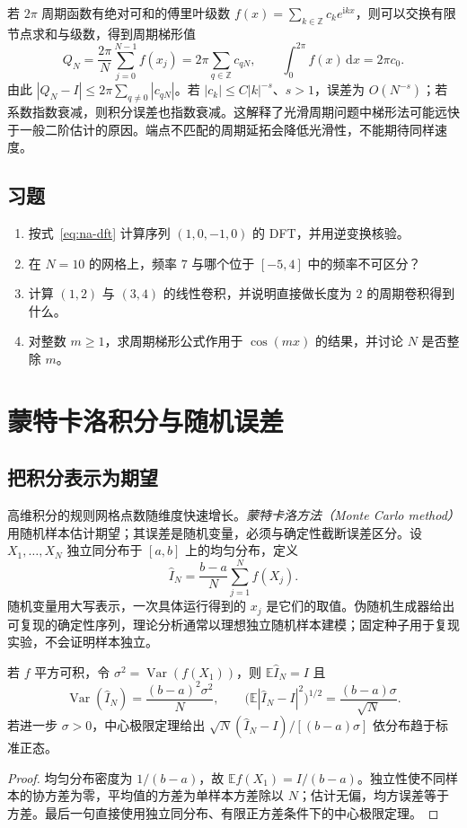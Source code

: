 \documentclass[UTF8,12pt,a4paper,fontset=fandol]{ctexbook}
\begin{document}
若 $2\pi$ 周期函数有绝对可和的傅里叶级数 $f(x)=\sum_{k\in\mathbb Z}c_ke^{\mathrm i kx}$，则可以交换有限节点求和与级数，得到周期梯形值
\[
 Q_N=\frac{2\pi}{N}\sum_{j=0}^{N-1}f(x_j)=2\pi\sum_{q\in\mathbb Z}c_{qN},\qquad
 \int_0^{2\pi}f(x)\,\mathrm dx=2\pi c_0.
\]
由此 $|Q_N-I|\le2\pi\sum_{q\ne0}|c_{qN}|$。若 $|c_k|\le C|k|^{-s}$、$s>1$，误差为 $O(N^{-s})$；若系数指数衰减，则积分误差也指数衰减。这解释了光滑周期问题中梯形法可能远快于一般二阶估计的原因。端点不匹配的周期延拓会降低光滑性，不能期待同样速度。

\section{习题}
\begin{enumerate}[label=\arabic*.]
\item\label{exr:na-fft-transform} 按式~\eqref{eq:na-dft} 计算序列 $(1,0,-1,0)$ 的 DFT，并用逆变换核验。
\item\label{exr:na-fft-alias} 在 $N=10$ 的网格上，频率 $7$ 与哪个位于 $[-5,4]$ 中的频率不可区分？
\item\label{exr:na-fft-convolution} 计算 $(1,2)$ 与 $(3,4)$ 的线性卷积，并说明直接做长度为 $2$ 的周期卷积得到什么。
\item\label{exr:na-fft-periodic} 对整数 $m\ge1$，求周期梯形公式作用于 $\cos(mx)$ 的结果，并讨论 $N$ 是否整除 $m$。
\end{enumerate}

\chapter{蒙特卡洛积分与随机误差}
\label{chap:na-montecarlo}

\section{把积分表示为期望}
高维积分的规则网格点数随维度快速增长。\emph{蒙特卡洛方法（Monte Carlo method）}用随机样本估计期望；其误差是随机变量，必须与确定性截断误差区分。设 $X_1,\ldots,X_N$ 独立同分布于 $[a,b]$ 上的均匀分布，定义
\begin{equation}
 \widehat I_N=\frac{b-a}{N}\sum_{j=1}^Nf(X_j).
 \label{eq:na-mc}
\end{equation}
随机变量用大写表示，一次具体运行得到的 $x_j$ 是它们的取值。伪随机生成器给出可复现的确定性序列，理论分析通常以理想独立随机样本建模；固定种子用于复现实验，不会证明样本独立。

\begin{theorem}[蒙特卡洛估计的均值和方差]
若 $f$ 平方可积，令 $\sigma^2=\operatorname{Var}(f(X_1))$，则 $\mathbb E\widehat I_N=I$ 且
\[
 \operatorname{Var}(\widehat I_N)=\frac{(b-a)^2\sigma^2}{N},\qquad
 \bigl(\mathbb E|\widehat I_N-I|^2\bigr)^{1/2}=\frac{(b-a)\sigma}{\sqrt N}.
\]
若进一步 $\sigma>0$，中心极限定理给出 $\sqrt N(\widehat I_N-I)/[(b-a)\sigma]$ 依分布趋于标准正态。
\end{theorem}
\begin{proof}
均匀分布密度为 $1/(b-a)$，故 $\mathbb E f(X_1)=I/(b-a)$。独立性使不同样本的协方差为零，平均值的方差为单样本方差除以 $N$；估计无偏，均方误差等于方差。最后一句直接使用独立同分布、有限正方差条件下的中心极限定理。
\end{proof}
\end{document}
